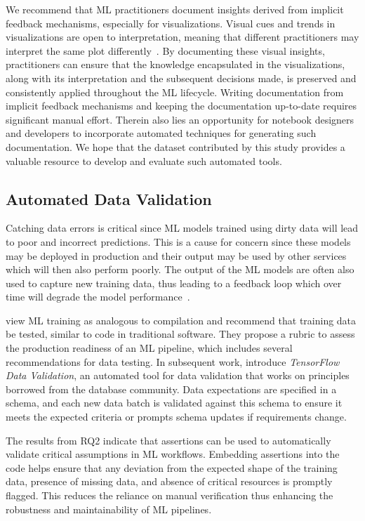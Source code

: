 \documentclass[journal]{IEEEtran}       %
\begin{document}
We recommend that ML practitioners document insights derived from
implicit feedback mechanisms, especially for visualizations. Visual
cues and trends in visualizations are open to interpretation, meaning
that different practitioners may interpret the same plot
differently~\cite{heer2010tour}. By documenting these visual
insights, practitioners can ensure that the knowledge encapsulated in
the visualizations, along with its interpretation and the subsequent
decisions made, is preserved and consistently applied throughout the
ML lifecycle. Writing documentation from implicit feedback mechanisms
and keeping the documentation up-to-date requires significant manual
effort. Therein also lies an opportunity for notebook designers and
developers to incorporate automated techniques for generating such
documentation. We hope that the dataset contributed by this study
provides a valuable resource to develop and evaluate such automated tools.

\subsection{Automated Data Validation}

Catching data errors is critical since ML models trained using dirty
data will lead to poor and incorrect predictions. This is a cause for
concern since these models may be deployed in production and their
output may be used by other services which will then also perform
poorly. The output of the ML models are often also used to capture
new training data, thus leading to a feedback loop which over time
will degrade the model performance~\cite{sculley2015hidden,breck2019data}.

\cite{breck2017ml} view ML training as analogous to compilation and
recommend that training data be tested, similar to code in
traditional software. They propose a rubric to assess the production
readiness of an ML pipeline, which includes several recommendations
for data testing. In subsequent work, \cite{breck2019data} introduce
\emph{TensorFlow Data Validation}, an automated tool for data
validation that works on principles borrowed from the database
community. Data expectations are specified in a schema, and each new
data batch is validated against this schema to ensure it meets the
expected criteria or prompts schema updates if requirements change.

The results from RQ2 indicate that assertions can be used to
automatically validate critical assumptions in ML workflows.
Embedding assertions into the code helps ensure that any deviation
from the expected shape of the training data, presence of missing
data, and absence of critical resources is promptly flagged. This
reduces the reliance on manual verification thus enhancing the
robustness and maintainability of ML pipelines.
\end{document}
